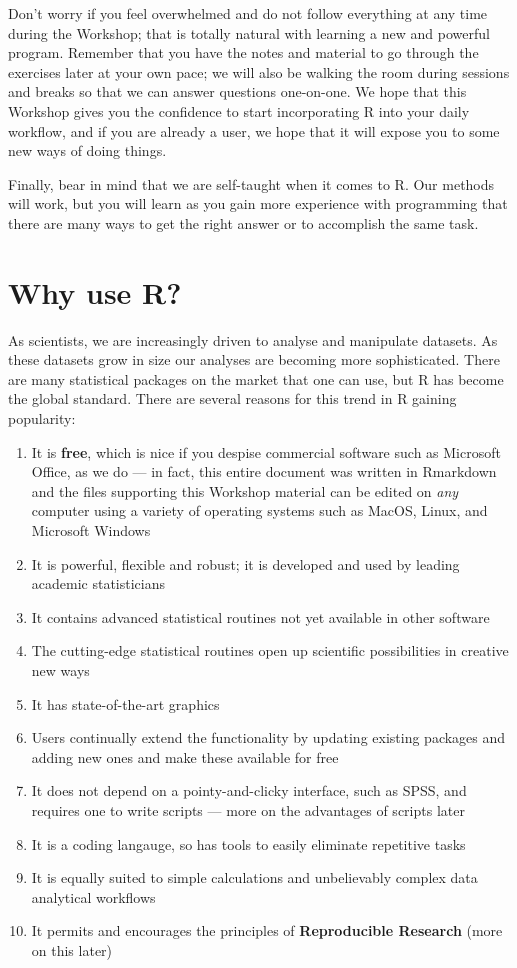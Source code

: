 \documentclass[
]{book}
\begin{document}
Don't worry if you feel overwhelmed and do not follow everything at any time during the Workshop; that is totally natural with learning a new and powerful program. Remember that you have the notes and material to go through the exercises later at your own pace; we will also be walking the room during sessions and breaks so that we can answer questions one-on-one. We hope that this Workshop gives you the confidence to start incorporating R into your daily workflow, and if you are already a user, we hope that it will expose you to some new ways of doing things.

Finally, bear in mind that we are self-taught when it comes to R. Our methods will work, but you will learn as you gain more experience with programming that there are many ways to get the right answer or to accomplish the same task.

\hypertarget{why-use-r}{%
\section{Why use R?}\label{why-use-r}}

As scientists, we are increasingly driven to analyse and manipulate datasets. As these datasets grow in size our analyses are becoming more sophisticated. There are many statistical packages on the market that one can use, but R has become the global standard. There are several reasons for this trend in R gaining popularity:

\begin{enumerate}
\def\labelenumi{\arabic{enumi}.}
\item
  It is \textbf{free}, which is nice if you despise commercial software such as Microsoft Office, as we do --- in fact, this entire document was written in Rmarkdown and the files supporting this Workshop material can be edited on \emph{any} computer using a variety of operating systems such as MacOS, Linux, and Microsoft Windows
\item
  It is powerful, flexible and robust; it is developed and used by leading academic statisticians
\item
  It contains advanced statistical routines not yet available in other software
\item
  The cutting-edge statistical routines open up scientific possibilities in creative new ways
\item
  It has state-of-the-art graphics
\item
  Users continually extend the functionality by updating existing packages and adding new ones and make these available for free
\item
  It does not depend on a pointy-and-clicky interface, such as SPSS, and requires one to write scripts --- more on the advantages of scripts later
\item
  It is a coding langauge, so has tools to easily eliminate repetitive tasks
\item
  It is equally suited to simple calculations and unbelievably complex data analytical workflows
\item
  It permits and encourages the principles of \textbf{Reproducible Research} (more on this later)
\end{enumerate}
\end{document}
